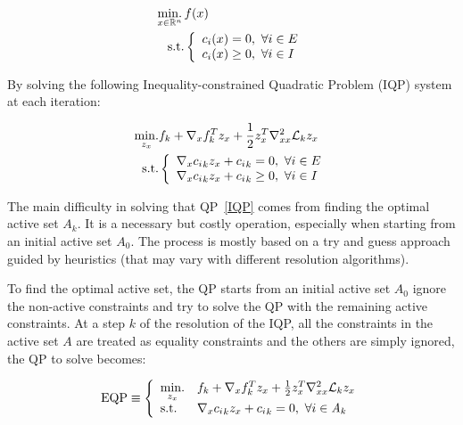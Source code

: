 \begin{equation}
\label{eq:prob_with_ineq}
\begin{aligned}
  \operatorname*{min.}_{x\in\mathbb{R}^n}{}&{f(x)}\\
  \text{s.t.}&
  \left\{
  \begin{array}{l}
    c_i(x) = 0,\ \forall i\in{E}\\
    c_i(x) \geq 0,\ \forall i\in{I}\\
  \end{array}
  \right.
\end{aligned}
\end{equation}

By solving the following Inequality-constrained Quadratic Problem (IQP) system at each iteration:

\begin{equation}
\label{IQP}
  \begin{aligned}
    \operatorname*{min.}\limits_{z_x} &f_k + \nabla_x f_k ^T z_x + \frac{1}{2} z_x^T\nabla_{xx}^2\mathcal{L}_k z_x \\
    \text{s.t.} &
  \left\{
  \begin{array}{l}
    \nabla_x {c_i}_k z_x + {c_i}_k = 0 ,\ \forall i\in E\\
    \nabla_x {c_i}_k z_x + {c_i}_k \geq 0 ,\ \forall i\in I\\
  \end{array}
  \right.
  \end{aligned}
\end{equation}

The main difficulty in solving that QP~\ref{IQP} comes from finding the optimal active set $\mathit{A}_k$.
It is a necessary but costly operation, especially when starting from an initial active set $\mathit{A}_0$.
The process is mostly based on a try and guess approach guided by heuristics (that may vary with different resolution algorithms).

To find the optimal active set, the QP starts from an initial active set $\mathit{A}_0$ ignore the non-active constraints and try to solve the QP with the remaining active constraints.
At a step $k$ of the resolution of the IQP, all the constraints in the active set $\mathit{A}$ are treated as equality constraints and the others are simply ignored, the QP to solve becomes:

\begin{equation}
  \text{EQP} \equiv \left\{
  \begin{array}{ll}
    \operatorname*{min.}\limits_{z_x} &f_k + \nabla_x f_k ^T z_x + \frac{1}{2} z_x^T\nabla_{xx}^2\mathcal{L}_k z_x \\
    \text{s.t.} & \nabla_x {c_i}_k z_x + {c_i}_k = 0 ,\ \forall i\in \mathit{A}_k\\
  \end{array}
  \right.
\end{equation}

